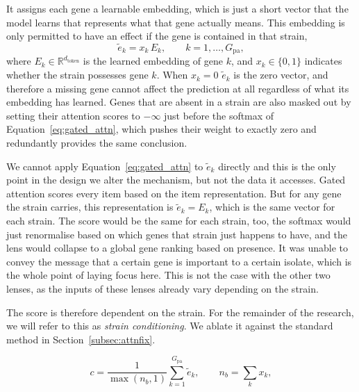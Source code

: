 It assigns each gene a learnable embedding, which is just a short vector that the model
learns that represents what that gene actually means. This embedding is only permitted to
have an effect if the gene is contained in that strain,
\begin{equation}
\tilde{e}_k = x_k \, E_k, \qquad k = 1, \dots, G_{\mathrm{pa}},
\label{eq:expertB_embed}
\end{equation}
where $E_k \in \mathbb{R}^{d_{\mathrm{token}}}$ is the learned embedding of gene $k$, and
$x_k \in \{0,1\}$ indicates whether the strain possesses gene $k$. When $x_k = 0$
$\tilde{e}_k$ is the zero vector, and therefore a missing gene cannot affect the prediction at
all regardless of what its embedding has learned. Genes that are absent in a strain are also
masked out by setting their attention scores to $-\infty$ just before the softmax of
Equation~\eqref{eq:gated_attn}, which pushes their weight to exactly zero and redundantly
provides the same conclusion.

\vspace{1em}

We cannot apply Equation~\eqref{eq:gated_attn} to $\tilde{e}_k$ directly and this is the only
point in the design we alter the mechanism, but not the data it accesses. Gated attention
scores every item based on the item representation. But for any gene the strain carries, this
representation is $\tilde{e}_k = E_k$, which is the same vector for each strain. The score
would be the same for each strain, too, the softmax would just renormalise based on which
genes that strain just happens to have, and the lens would collapse to a global gene ranking
based on presence. It was unable to convey the message that a certain gene is important to a
certain isolate, which is the whole point of laying focus here. This is not the case with the
other two lenses, as the inputs of these lenses already vary depending on the strain.

\vspace{1em}

The score is therefore dependent on the strain. For the remainder of the research, we will refer
to this as \emph{strain conditioning}. We ablate it against the standard method in
Section~\ref{subsec:attnfix}.

\begin{equation}
c = \frac{1}{\max(n_b, 1)} \sum_{k=1}^{G_{\mathrm{pa}}} \tilde{e}_k,
\qquad n_b = \sum_k x_k,
\label{eq:expertB_ctx}
\end{equation}

